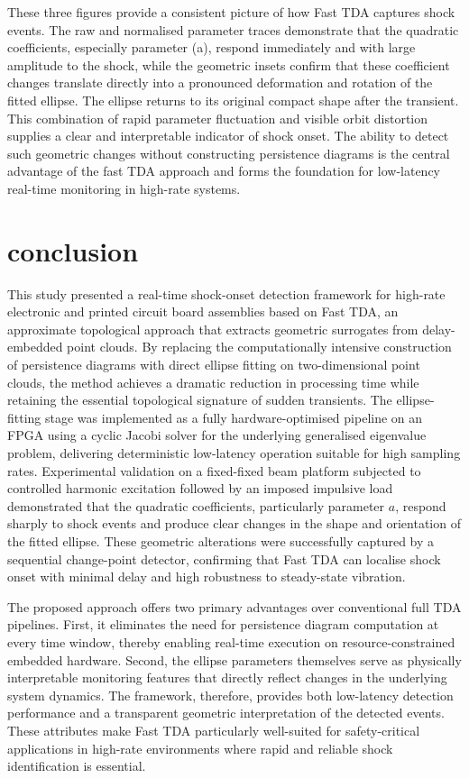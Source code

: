 \documentclass[colorlinks,upint,subscriptcorrection,varvw,hyphenate,balance,greek,russian,vietnamese,german]{asmeconf} %
\begin{document}
These three figures provide a consistent picture of how Fast TDA captures shock events. The raw and normalised parameter traces demonstrate that the quadratic coefficients, especially parameter (a), respond immediately and with large amplitude to the shock, while the geometric insets confirm that these coefficient changes translate directly into a pronounced deformation and rotation of the fitted ellipse. The ellipse returns to its original compact shape after the transient. This combination of rapid parameter fluctuation and visible orbit distortion supplies a clear and interpretable indicator of shock onset. The ability to detect such geometric changes without constructing persistence diagrams is the central advantage of the fast TDA approach and forms the foundation for low-latency real-time monitoring in high-rate systems.




\section{conclusion}


This study presented a real-time shock-onset detection framework for high-rate electronic and printed circuit board assemblies based on Fast TDA, an approximate topological approach that extracts geometric surrogates from delay-embedded point clouds. By replacing the computationally intensive construction of persistence diagrams with direct ellipse fitting on two-dimensional point clouds, the method achieves a dramatic reduction in processing time while retaining the essential topological signature of sudden transients. The ellipse-fitting stage was implemented as a fully hardware-optimised pipeline on an FPGA using a cyclic Jacobi solver for the underlying generalised eigenvalue problem, delivering deterministic low-latency operation suitable for high sampling rates. Experimental validation on a fixed-fixed beam platform subjected to controlled harmonic excitation followed by an imposed impulsive load demonstrated that the quadratic coefficients, particularly parameter \(a\), respond sharply to shock events and produce clear changes in the shape and orientation of the fitted ellipse. These geometric alterations were successfully captured by a sequential change-point detector, confirming that Fast TDA can localise shock onset with minimal delay and high robustness to steady-state vibration.

The proposed approach offers two primary advantages over conventional full TDA pipelines. First, it eliminates the need for persistence diagram computation at every time window, thereby enabling real-time execution on resource-constrained embedded hardware. Second, the ellipse parameters themselves serve as physically interpretable monitoring features that directly reflect changes in the underlying system dynamics. The framework, therefore, provides both low-latency detection performance and a transparent geometric interpretation of the detected events. These attributes make Fast TDA particularly well-suited for safety-critical applications in high-rate environments where rapid and reliable shock identification is essential.
\end{document}
